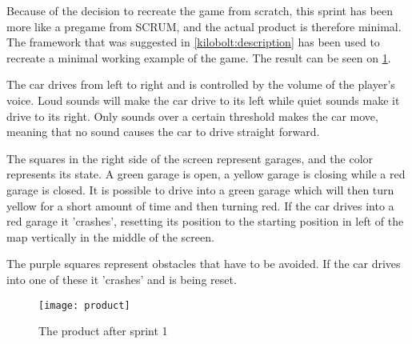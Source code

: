 Because of the decision to recreate the game from scratch, this sprint has been more like a pregame from SCRUM, and the actual product is therefore minimal.
The framework that was suggested in \cref{kilobolt:description} has been used to recreate a minimal working example of the game.
The result can be seen on \cref{product-sprint1}.

The car drives from left to right and is controlled by the volume of the player's voice. 
Loud sounds will make the car drive to its left while quiet sounds make it drive to its right.
Only sounds over a certain threshold makes the car move, meaning that no sound causes the car to drive straight forward.

The squares in the right side of the screen represent garages, and the color represents its state. 
A green garage is open, a yellow garage is closing while a red garage is closed.
It is possible to drive into a green garage which will then turn yellow for a short amount of time and then turning red.
If the car drives into a red garage it 'crashes', resetting its position to the starting position in left of the map vertically in the middle of the screen.

The purple squares represent obstacles that have to be avoided. 
If the car drives into one of these it 'crashes' and is being reset.


\begin{figure}
\texttt{[image: product]}
\caption{The product after sprint 1}
\label{product-sprint1}
\end{figure}